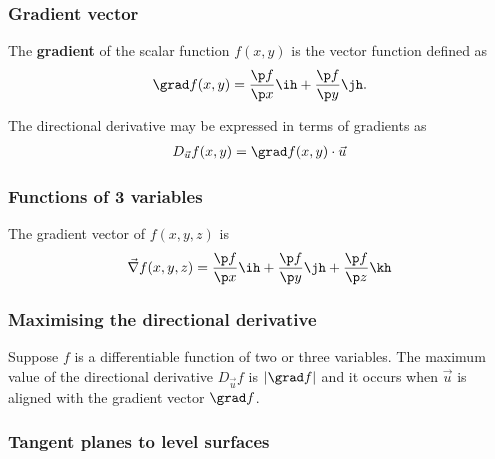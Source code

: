 \documentclass{article}
\begin{document}
\subsubsection{Gradient vector}

\begin{definition}
	The \textbf{gradient} of the scalar function $f(x,y)$ is the vector
	function defined as
	\begin{align*}
		\grad f(x,y)=\frac{\p f}{\p x}\ih + \frac{\p f}{\p y}\jh.
	\end{align*}
\end{definition}
\begin{theorem}
	The directional derivative may be expressed in terms of gradients
	as
	\begin{align*}
		D_{\vec u}f(x,y)=\grad f(x,y)\cdot \vec u
	\end{align*}
\end{theorem}

\subsubsection{Functions of 3 variables}

\begin{definition}
	The gradient vector of $f(x,y,z)$ is
	\begin{align*}
		\vec\nabla f(x,y,z)=\frac{\p f}{\p x}\ih
		+ \frac{\p f}{\p y}\jh + \frac{\p f}{\p z}\kh
	\end{align*}
\end{definition}

\subsubsection{Maximising the directional derivative}

\begin{theorem}
	Suppose $f$ is a differentiable function of two or three variables.
	The maximum value of the directional derivative $D_{\vec u}f$ is
	$|\grad f|$ and it occurs when $\vec u$ is aligned with the gradient
	vector $\grad f$.
\end{theorem}

\subsubsection{Tangent planes to level surfaces}
\end{document}
